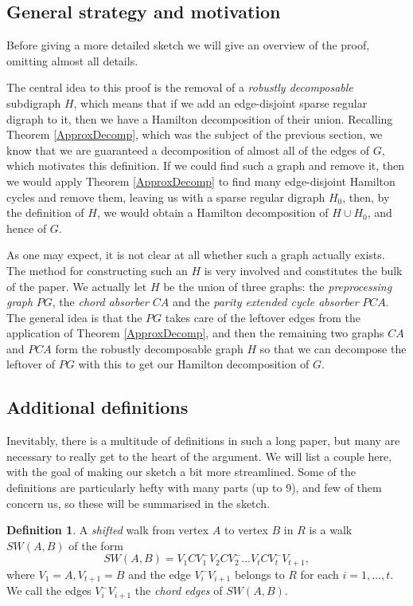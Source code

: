 \documentclass[10pt,letterpaper, reqno]{amsart}
\theoremstyle{definition}
\newtheorem{defn}[thm]{Definition}
\numberwithin{equation}{section}
\begin{document}
\subsection{General strategy and motivation}
Before giving a more detailed sketch we will give an overview of the proof, omitting almost all details. 

The central idea to this proof is the removal of a \textit{robustly decomposable} subdigraph $H$, which means that if we add an edge-disjoint sparse regular digraph to it, then we have a Hamilton decomposition of their union. Recalling Theorem \ref{ApproxDecomp}, which was the subject of the previous section, we know that we are guaranteed a decomposition of almost all of the edges of $G$, which motivates this definition. If we could find such a graph and remove it, then we would apply Theorem \ref{ApproxDecomp} to find many edge-disjoint Hamilton cycles and remove them, leaving us with a sparse regular digraph $H_0$, then, by the definition of $H$, we would obtain a Hamilton decomposition of $H \cup H_0$, and hence of $G$. 

As one may expect, it is not clear at all whether such a graph actually exists. The method for constructing such an $H$ is very involved and constitutes the bulk of the paper. We actually let $H$ be the union of three graphs: the \textit{preprocessing graph} $PG$, the \textit{chord absorber} $CA$ and the \textit{parity extended cycle absorber} $PCA$. The general idea is that the $PG$ takes care of the leftover edges from the application of Theorem \ref{ApproxDecomp}, and then the remaining two graphs $CA$ and $PCA$ form the robustly decomposable graph $H$ so that we can decompose the leftover of $PG$ with this to get our Hamilton decomposition of $G$. 

\subsection{Additional definitions}
Inevitably, there is a multitude of definitions in such a long paper, but many are necessary to really get to the heart of the argument. We will list a couple here, with the goal of making our sketch a bit more streamlined. Some of the definitions are particularly hefty with many parts (up to 9), and few of them concern us, so these will be summarised in the sketch. 
\begin{defn}
	A \textit{shifted} walk from vertex $A$ to vertex $B$ in $R$ is a walk $SW(A,B)$ of the form 
	$$ SW(A,B) = V_1CV_1^- V_2 C V_2^- \dots V_t CV_t^- V_{t+1},$$ where $V_1=A, V_{t+1}=B$ and the edge $V_i^-V_{i+1}$ belongs to $R$ for each $i=1, \dots , t$. We call the edges $V_i^-V_{i+1}$ the \textit{chord edges} of $SW(A,B)$. 
\end{defn}
\end{document}

